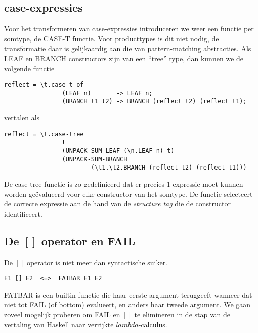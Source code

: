 \documentclass[a4paper,10pt]{article}
\begin{document}
\subsection{case-expressies}
Voor het transformeren van case-expressies introduceren we weer een functie per somtype, de CASE-T functie.
Voor producttypes is dit niet nodig, de transformatie daar is gelijkaardig aan die van pattern-matching abstracties.
Als LEAF en BRANCH constructors zijn van een ``tree'' type, dan kunnen we de volgende functie
\begin{verbatim}
reflect = \t.case t of
                (LEAF n)       -> LEAF n;
                (BRANCH t1 t2) -> BRANCH (reflect t2) (reflect t1);
\end{verbatim}
vertalen als
\begin{verbatim}
reflect = \t.case-tree 
                t
                (UNPACK-SUM-LEAF (\n.LEAF n) t)
                (UNPACK-SUM-BRANCH 
                        (\t1.\t2.BRANCH (reflect t2) (reflect t1)))
\end{verbatim}
De case-tree functie is zo gedefinieerd dat er precies 1 expressie moet kunnen worden ge{\"e}valueerd voor elke constructor van het somtype. De functie selecteert de correcte expressie aan de hand van de \emph{structure tag} die de constructor identificeert.

\subsection{De $[]$ operator en FAIL}
De $[]$ operator is niet meer dan syntactische suiker.
\begin{verbatim}
E1 [] E2  <=>  FATBAR E1 E2
\end{verbatim}
FATBAR is een builtin functie die haar eerste argument teruggeeft wanneer dat niet tot FAIL (of bottom) evalueert, en anders haar tweede argument.
We gaan zoveel mogelijk proberen om FAIL en $[]$ te elimineren in de stap van de vertaling van Haskell naar verrijkte $lambda$-calculus.
\end{document}

